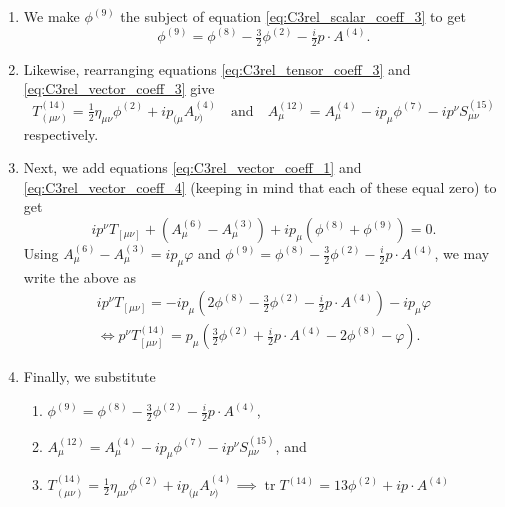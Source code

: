 \documentclass[11pt,reqno,a4paper,final]{amsart}
\theoremstyle{plain}
\theoremstyle{definition}
\newcommand{\phisup}[1]{\phi^{(#1)}}
\newcommand{\Asup}[1]{A^{(#1)}}
\newcommand{\tr}{\operatorname{tr}}
\newcommand{\1}{\mathbb{1}}
\numberwithin{equation}{section}
\begin{document}
\begin{appendices}
\begin{enumerate}
    \item We make $\phisup{9}$ the subject of equation \eqref{eq:C3rel_scalar_coeff_3} to get
    $$\boxed{\phisup{9} = \phisup{8} - \tfrac32 \phisup{2} - \tfrac i2 p \cdot \Asup{4}.}$$
    \item Likewise, rearranging equations \eqref{eq:C3rel_tensor_coeff_3} and \eqref{eq:C3rel_vector_coeff_3} give
    $$\boxed{T^{(14)}_{(\mu\nu)} = \tfrac12\eta_{\mu\nu} \phisup{2} + ip_{(\mu}\Asup{4}_{\nu)}} \quad \text{and} \quad   \boxed{\Asup{12}_\mu = \Asup{4}_\mu - ip_\mu \phisup{7} - ip^\nu S^{(15)}_{\mu\nu}}$$
    respectively.
    \item Next, we add equations \eqref{eq:C3rel_vector_coeff_1} and \eqref{eq:C3rel_vector_coeff_4}
    (keeping in mind that each of these equal zero) to get
    \begin{equation*}
        i p^\nu T_{[\mu\nu]} + (\Asup{6}_\mu - \Asup{3}_\mu) + ip_\mu (\phisup{8} + \phisup{9}) = 0.
    \end{equation*}
    Using $\Asup{6}_\mu - \Asup{3}_\mu = i p_\mu \varphi$ and $\phisup{9} = \phisup{8} - \tfrac32 \phisup{2} - \tfrac i2 p \cdot \Asup{4}$, we may write the above as
    \begin{equation*}
    \begin{split}
        i p^\nu T_{[\mu\nu]} = -ip_\mu (2\phisup{8} - \tfrac32 \phisup{2} - \tfrac i2 p \cdot \Asup{4}) - i p_\mu \varphi \\
        \iff   \boxed{p^\nu T_{[\mu\nu]}^{(14)} = p_\mu \left(\tfrac32 \phi^{(2)} + \tfrac{i}2 p \cdot A^{(4)} - 2 \phi^{(8)} - \varphi \right).}
    \end{split}
    \end{equation*}
    \item Finally, we substitute 
    \begin{enumerate}
        \item $\phisup{9} = \phisup{8} - \tfrac32 \phisup{2} - \tfrac i2 p \cdot \Asup{4}$,
        \item $\Asup{12}_\mu = \Asup{4}_\mu - ip_\mu \phisup{7} - ip^\nu S^{(15)}_{\mu\nu}$, and
        \item $T^{(14)}_{(\mu\nu)} = \tfrac12\eta_{\mu\nu} \phisup{2} + ip_{(\mu}\Asup{4}_{\nu)} \implies \tr T^{(14)} = 13 \phisup{2} + i p \cdot \Asup{4}$

\end{enumerate}
\end{enumerate}
\end{appendices}
\end{document}
